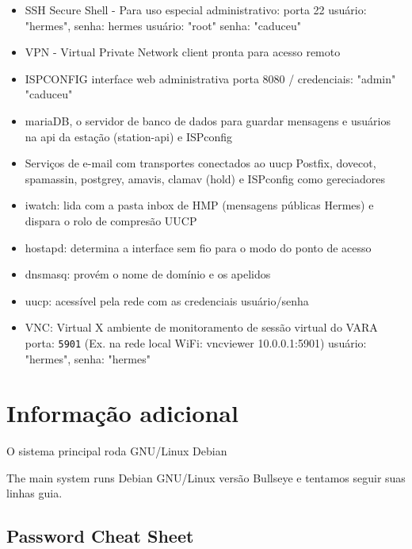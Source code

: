 \documentclass[11pt,a4paper]{article}
\begin{document}
\begin{itemize}
    \item SSH Secure Shell - Para uso especial administrativo: porta 22\newline
        \hfill usuário: "hermes", senha: hermes\newline
        \hfill usuário: "root" senha: "caduceu"
    \item VPN -  Virtual Private Network client pronta para acesso remoto
    \item ISPCONFIG interface web administrativa \newline
        \hfill porta 8080 / credenciais: "admin" "caduceu"
    \item mariaDB, o servidor de banco de dados para guardar mensagens e usuários na api da estação (station-api) e ISPconfig
    \item Serviços de e-mail com transportes conectados ao uucp
    \newline
        \hfill Postfix, dovecot, spamassin, postgrey, amavis, clamav (hold) e ISPconfig como gereciadores 
    \item iwatch: lida com a pasta inbox de HMP (mensagens públicas Hermes) e dispara o rolo de compresão UUCP
    \item hostapd: determina a interface sem fio para o modo do ponto de acesso
    \item dnsmasq: provém o nome de domínio e os apelidos 
    \item uucp: acessível pela rede com as credenciais usuário/senha%
    \item VNC: Virtual X ambiente de monitoramento de sessão virtual do VARA
        \hfill porta: \texttt{5901} (Ex. na rede local WiFi: vncviewer 10.0.0.1:5901) 
        \hfill usuário: "hermes", senha: "hermes"
\end{itemize}

\section{Informação adicional}
\label{apx_adit_info}
    O sistema principal roda GNU/Linux Debian 

    The main system runs Debian GNU/Linux versão Bullseye e tentamos seguir suas linhas guia. 

\subsection{Password Cheat Sheet}
\label{passwords}
\end{document}
